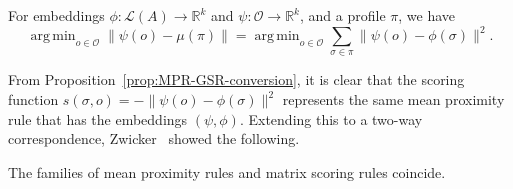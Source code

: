 \documentclass[prodmode]{acmsmall-ec14}
\newcommand{\calL}{{\mathcal{L}}}
\newcommand{\rank}{{\calL(A)}}
\newcommand{\calO}{{\mathcal{O}}}
\DeclareMathOperator*{\argmin}{arg\,min}
\begin{document}
\begin{proposition}
For embeddings $\phi : \rank \rightarrow \mathbb{R}^k$ and $\psi: \calO \to \mathbb{R}^k$, and a profile $\pi$, we have
\begin{equation}
\argmin_{o \in \calO} \|\psi(o)-\mu(\pi)\| = \argmin_{o \in \calO} \sum_{\sigma \in \pi} \|\psi(o)-\phi(\sigma)\|^2.
\label{eqn:discrete-mean}
\end{equation}
\label{prop:MPR-GSR-conversion}
\end{proposition}
%
From Proposition~\ref{prop:MPR-GSR-conversion}, it is clear that the scoring function $s(\sigma,o) = -\|\psi(o)-\phi(\sigma)\|^2$ represents the same mean proximity rule that has the embeddings $(\psi,\phi)$. Extending this to a two-way correspondence, Zwicker~ showed the following. 
\begin{proposition}
The families of mean proximity rules and matrix scoring rules coincide. 
\label{prop:equiv}
\end{proposition}
\end{document}

